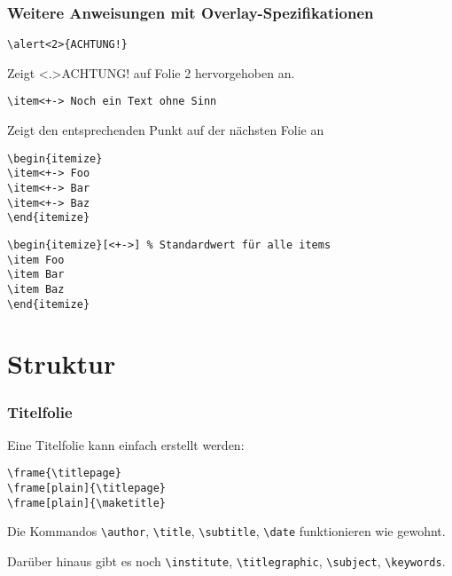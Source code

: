 \begin{slide}
  \frametitle{Weitere Anweisungen mit Overlay-Spezifikationen}

  \onslide<+->

  \begin{Beispiele}
\begin{lstlisting}
\alert<2>{ACHTUNG!}
\end{lstlisting}
    Zeigt \alert<.>{ACHTUNG!} auf Folie 2 hervorgehoben an.
    \onslide<+->
\begin{lstlisting}
\item<+-> Noch ein Text ohne Sinn
\end{lstlisting}
    Zeigt den entsprechenden Punkt auf der nächsten Folie an
    \begin{overprint}[\linewidth] %
\begin{lstlisting}
\begin{itemize}
\item<+-> Foo
\item<+-> Bar
\item<+-> Baz
\end{itemize}
\end{lstlisting}
\begin{lstlisting}
\begin{itemize}[<+->] % Standardwert für alle items
\item Foo
\item Bar
\item Baz
\end{itemize}
\end{lstlisting}
    \end{overprint}
  \end{Beispiele}

\end{slide}

\section{Struktur}

\begin{slide}
  \frametitle{Titelfolie}

  Eine Titelfolie kann einfach erstellt werden:
\begin{lstlisting}
\frame{\titlepage}
\frame[plain]{\titlepage}
\frame[plain]{\maketitle}
\end{lstlisting}

  \onslide<+->

  Die Kommandos \lstinline{\author}, \lstinline{\title}, \lstinline{\subtitle},
  \lstinline{\date} funktionieren wie gewohnt.

  \onslide<+->

  Darüber hinaus gibt es noch \lstinline{\institute}, \lstinline{\titlegraphic},
  \lstinline{\subject}, \lstinline{\keywords}.

\end{slide}

